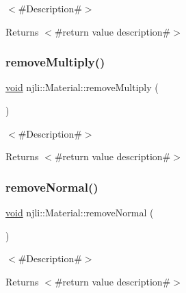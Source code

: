 $<$\#\+Description\#$>$

\begin{DoxyReturn}{Returns}
$<$\#return value description\#$>$ 
\end{DoxyReturn}
\mbox{\label{classnjli_1_1_material_a8761380e9d38fc626c5b66643a3e5ee4}} 
\subsubsection{\texorpdfstring{remove\+Multiply()}{removeMultiply()}}
{\footnotesize\ttfamily \mbox{\hyperlink{_thread_8h_af1e856da2e658414cb2456cb6f7ebc66}{void}} njli\+::\+Material\+::remove\+Multiply (\begin{DoxyParamCaption}{ }\end{DoxyParamCaption})\hspace{0.3cm}{\ttfamily [protected]}}

$<$\#\+Description\#$>$

\begin{DoxyReturn}{Returns}
$<$\#return value description\#$>$ 
\end{DoxyReturn}
\mbox{\label{classnjli_1_1_material_af454f737db887890ea70cb35d16f0348}} 
\subsubsection{\texorpdfstring{remove\+Normal()}{removeNormal()}}
{\footnotesize\ttfamily \mbox{\hyperlink{_thread_8h_af1e856da2e658414cb2456cb6f7ebc66}{void}} njli\+::\+Material\+::remove\+Normal (\begin{DoxyParamCaption}{ }\end{DoxyParamCaption})\hspace{0.3cm}{\ttfamily [protected]}}

$<$\#\+Description\#$>$

\begin{DoxyReturn}{Returns}
$<$\#return value description\#$>$ 
\end{DoxyReturn}
\mbox{\label{classnjli_1_1_material_a0edc0a0e9ff9784bb1d63c7ddb795913}} 
